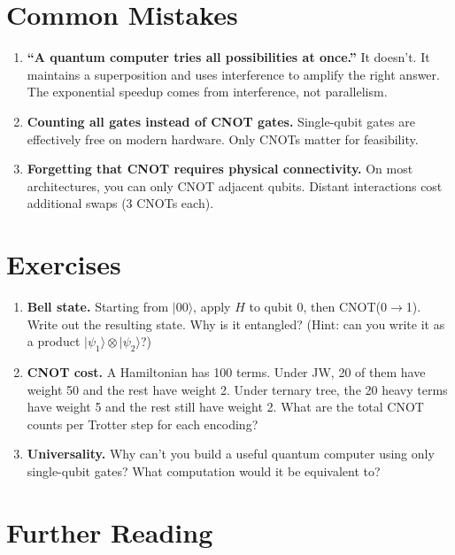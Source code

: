 \documentclass[
  11pt,
  oneside]{book}
\begin{document}
\section{Common Mistakes}\label{common-mistakes-3}

\begin{enumerate}
\def\labelenumi{\arabic{enumi}.}
\item
  \textbf{``A quantum computer tries all possibilities at once.''} It
  doesn't. It maintains a superposition and uses interference to amplify
  the right answer. The exponential speedup comes from interference, not
  parallelism.
\item
  \textbf{Counting all gates instead of CNOT gates.} Single-qubit gates
  are effectively free on modern hardware. Only CNOTs matter for
  feasibility.
\item
  \textbf{Forgetting that CNOT requires physical connectivity.} On most
  architectures, you can only CNOT adjacent qubits. Distant interactions
  cost additional swaps (3 CNOTs each).
\end{enumerate}

\section{Exercises}\label{exercises-3}

\begin{enumerate}
\def\labelenumi{\arabic{enumi}.}
\item
  \textbf{Bell state.} Starting from \(\lvert 00\rangle\), apply \(H\)
  to qubit 0, then CNOT(0$\rightarrow$1). Write out the resulting state. Why is it
  entangled? (Hint: can you write it as a product
  \(\lvert\psi_1\rangle \otimes \lvert\psi_2\rangle\)?)
\item
  \textbf{CNOT cost.} A Hamiltonian has 100 terms. Under JW, 20 of them
  have weight 50 and the rest have weight 2. Under ternary tree, the 20
  heavy terms have weight 5 and the rest still have weight 2. What are
  the total CNOT counts per Trotter step for each encoding?
\item
  \textbf{Universality.} Why can't you build a useful quantum computer
  using only single-qubit gates? What computation would it be equivalent
  to?
\end{enumerate}

\section{Further Reading}\label{further-reading-3}
\end{document}
